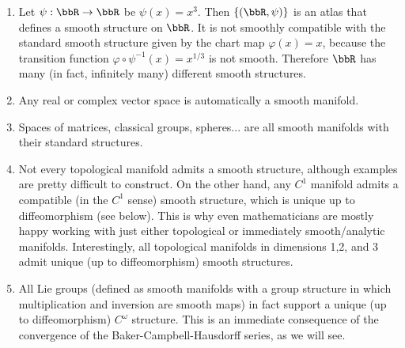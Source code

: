 \begin{example}
\begin{enumerate}
    \item Let $\psi:\bbR \to\bbR $ be $\psi(x)=x^3$. Then $\{(\bbR ,\psi)\}$ is an atlas that defines a smooth structure on $\bbR $. It is not smoothly compatible with the standard smooth structure given by the chart map $\varphi(x)=x$, because the transition function $\varphi\circ \psi^{-1}(x)=x^{1/3}$ is not smooth. Therefore $\bbR $ has many (in fact, infinitely many) different smooth structures.
    \item Any real or complex vector space is automatically a smooth manifold.
    \item Spaces of matrices, classical groups, spheres... are all smooth manifolds with their standard structures.
    \item Not every topological manifold admits a smooth structure, although examples are pretty difficult to construct. On the other hand, any $C^1$ manifold admits a compatible (in the $C^1$ sense) smooth structure, which is unique up to diffeomorphism (see below). This is why even mathematicians are mostly happy working with just either topological or immediately smooth/analytic manifolds. Interestingly, all topological manifolds in dimensions 1,2, and 3 admit unique (up to diffeomorphism) smooth structures.
    \item All Lie groups (defined as smooth manifolds with a group structure in which multiplication and inversion are smooth maps) in fact support a unique (up to diffeomorphism) $C^\omega$ structure. This is an immediate consequence of the convergence of the Baker-Campbell-Hausdorff series, as we will see.
\end{enumerate}
\end{example}

